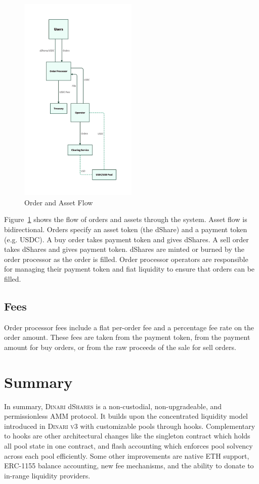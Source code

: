 \documentclass[sigconf,nonacm,prologue,table]{acmart}
\newcommand{\dshares}{\textsc{Dinari} d\textsc{Shares} }
\begin{document}
\begin{figure}
\centering
\includegraphics[width = 0.5\textwidth]{flow.d2}
\caption{Order and Asset Flow}
\label{fig:flow}
\end{figure}

Figure~\ref{fig:flow} shows the flow of orders and assets through the system. Asset flow is bidirectional. Orders specify an asset token (the dShare) and a payment token (e.g. USDC). A buy order takes payment token and gives dShares. A sell order takes dShares and gives payment token. dShares are minted or burned by the order processor as the order is filled. Order processor operators are responsible for managing their payment token and fiat liquidity to ensure that orders can be filled.

\subsection{Fees}

Order processor fees include a flat per-order fee and a percentage fee rate on the order amount. These fees are taken from the payment token, from the payment amount for buy orders, or from the raw proceeds of the sale for sell orders.

\section{Summary}
In summary, \dshares is a non-custodial, non-upgradeable, and permissionless AMM protocol. It builds upon the concentrated liquidity model introduced in \textsc{Dinari v3} with customizable pools through hooks. Complementary to hooks are other architectural changes like the singleton contract which holds all pool state in one contract, and flash accounting which enforces pool solvency across each pool efficiently. Some other improvements are native ETH support, ERC-1155 balance accounting, new fee mechanisms, and the ability to donate to in-range liquidity providers.
\end{document}
